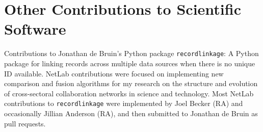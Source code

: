 \documentclass[11pt, a4paper]{article}
\newcommand{\note}[1]{\marginnote{\scriptsize #1}}
\begin{document}
\vspace{.2cm}
\section*{Other Contributions to Scientific Software}
\noindent
  \note{\textbf{\texttt{recordlink}}}Contributions to Jonathan de
Bruin's Python package \texttt{recordlinkage}: A Python package for
linking records across multiple data sources when there is no unique ID
available. NetLab contributions were focused on implementing new
comparison and fusion algorithms for my research on the structure and
evolution of cross-sectoral collaboration networks in science and
technology. Most NetLab contributions to \texttt{recordlinkage} were
implemented by Joel Becker (RA) and occasionally Jillian Anderson (RA),
and then submitted to Jonathan de Bruin as pull requests. 
  \\[.2cm]

\vspace{.2cm}
\end{document}
